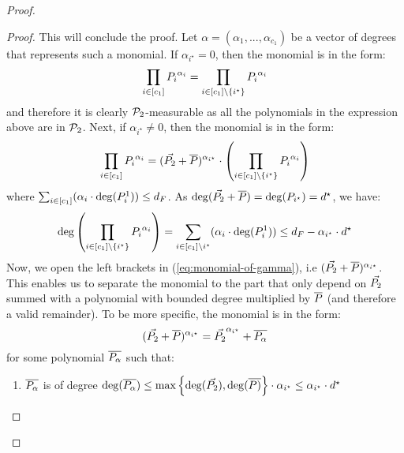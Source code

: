 \begin{proof}
\begin{proof}
        This will conclude the proof.
        \newline
        Let $\alpha = (\alpha_1,...,\alpha_{c_1})$ be a vector of degrees that represents such a monomial.
        If $\alpha_{i^\star} = 0$, then the monomial is in the form:
        \[
            \prod_{i \in [c_1]}{{\genpoly_i}^{\alpha_i}} =
            \prod_{i \in [c_1] \setminus \set{i^{\star}}}{{\genpoly_i}^{\alpha_i}}
        \]
        and therefore it is clearly $\genpolyset_2$-measurable as all the polynomials in the expression above are in $\genpolyset_2$.
        \newline
        Next, if $\alpha_{i^\star} \neq 0$, then the monomial is in the form:
       \begin{equation} \label{eq:monomial-of-gamma}
            \prod_{i \in [c_1]}{{\genpoly_i}^{\alpha_i}} =
            (\vec{\genpoly_2} + \relativeremainder{\genpoly})^{\alpha_{i^\star}} \cdot
                \parens{\prod_{i \in [c_1] \setminus \set{i^{\star}}}{{\genpoly_i}^{\alpha_i}}}
       \end{equation}
        where $\sum_{i \in [c_1]}(\alpha_i \cdot \deg(\genpoly_i^1)) \leq \degree_{\genfunc}$.
        As $\deg(\vec{\genpoly_2} + \relativeremainder{\genpoly}) = \deg(\genpoly_{i^\star}) =\degree^{\star}$, we have:
        \[
            \deg \parens{\prod_{i \in [c_1] \setminus \set{i^{\star}}}{{\genpoly_i}^{\alpha_i}}} =
                \sum_{i \in [c_1] \setminus {i^{\star}}}(\alpha_i \cdot \deg(\genpoly_i^1))
                \leq \degree_{\genfunc} - \alpha_{i^\star} \cdot \degree^{\star}
        \]
        Now, we open the left brackets in (\ref{eq:monomial-of-gamma}), i.e $(\vec{\genpoly_2} + \relativeremainder{\genpoly})^{\alpha_{i^\star}}$.
        This enables us to separate the monomial to the part that only depend on $\vec{\genpoly_2}$ summed with a polynomial with bounded degree multiplied by $\relativeremainder{\genpoly}$ (and therefore a valid remainder).
        To be more specific, the monomial is in the form:
        \[
            (\vec{\genpoly_2} + \relativeremainder{\genpoly})^{\alpha_{i^\star}} = \vec{\genpoly_2}^{\alpha_{i^\star}} + \relativeremainder{\genpoly_{\alpha}}
        \]
        for some polynomial $\relativeremainder{\genpoly_{\alpha}}$ such that:
        \begin{enumerate}
            \item $\relativeremainder{\genpoly_{\alpha}}$ is of degree
                    $\deg(\relativeremainder{\genpoly_{\alpha}}) \leq \max \set{\deg(\vec{\genpoly_2}), \deg(\relativeremainder{\genpoly)}} \cdot \alpha_{i^\star} \leq \alpha_{i^\star} \cdot \degree^{\star}$

\end{enumerate}
\end{proof}
\end{proof}
